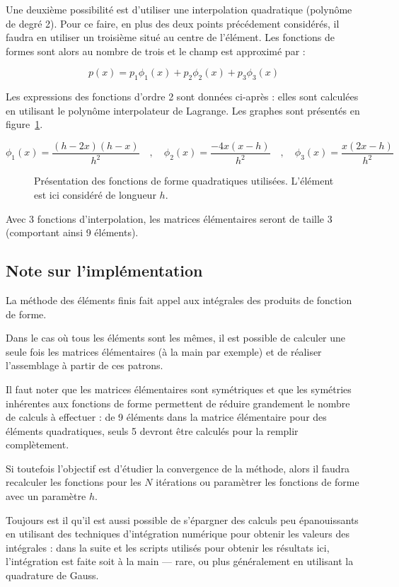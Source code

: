 Une deuxième possibilité est d'utiliser une interpolation quadratique (polynôme de degré 2). Pour ce faire, en plus des
deux points précédement considérés, il faudra en utiliser un troisième situé au centre de l'élément. Les fonctions de
formes sont alors au nombre de trois et le champ est approximé par :

$$p(x) = p_1\phi_1(x) + p_2\phi_2(x) + p_3\phi_3(x)$$

Les expressions des fonctions d'ordre 2 sont données ci-après : elles sont calculées en utilisant le polynôme
interpolateur de Lagrange. Les graphes sont présentés en figure~\ref{fig:FEM:shape_fun_quad}.

\begin{equation*}
	\phi_1(x) = \frac{(h-2x)(h-x)}{h^2} \quad,\quad \phi_2(x) = \frac{-4x(x-h)}{h^2} \quad,\quad \phi_3(x) = \frac{x(2x-h)}{h^2}
\end{equation*}

\begin{figure}[!ht]
	\centering
	
	\caption{\label{fig:FEM:shape_fun_quad}Présentation des fonctions de forme quadratiques utilisées. L'élément est ici considéré
	de longueur $h$.}
\end{figure}

Avec 3 fonctions d'interpolation, les matrices élémentaires seront de taille 3 (comportant ainsi 9 éléments).

\subsection{Note sur l'implémentation}

La méthode des éléments finis fait appel aux intégrales des produits de fonction de forme.

Dans le cas où tous les éléments sont les mêmes, il est possible de calculer une seule fois les matrices élémentaires (à
la main par exemple) et de réaliser l'assemblage à partir de ces patrons.

Il faut noter que les matrices élémentaires sont symétriques et que les symétries inhérentes aux fonctions de forme
permettent de réduire grandement le nombre de calculs à effectuer : de 9 éléments dans la matrice élémentaire pour des
éléments quadratiques, seuls 5 devront être calculés pour la remplir complètement. 

Si toutefois l'objectif est d'étudier la convergence de la méthode, alors il faudra recalculer les fonctions pour les
$N$ itérations ou paramètrer les fonctions de forme avec un paramètre $h$.

Toujours est il qu'il est aussi possible de s'épargner des calculs peu épanouissants en utilisant des techniques
d'intégration numérique pour obtenir les valeurs des intégrales : dans la suite et les scripts utilisés pour obtenir les
résultats ici, l'intégration est faite soit à la main --- rare, ou plus généralement en utilisant la quadrature de
Gauss.

